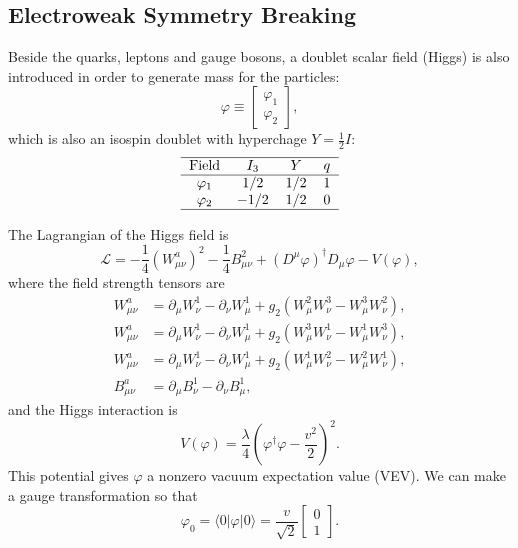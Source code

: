 \subsection{Electroweak Symmetry Breaking}
Beside the quarks, leptons and gauge bosons, a doublet scalar field (Higgs) is also introduced in order to generate mass for the particles:
\begin{equation}
	\varphi \equiv \left[\begin{array}{c}
		\varphi_1 \\ \varphi_2
	\end{array} \right],
\end{equation}
which is also an isospin doublet with hyperchage $Y=\frac{1}{2}I$:
\begin{equation}
	\begin{tabular}{c c c c}
		\hline 
		Field & $I_3$ & $Y$ & $q$\\ \hline
		$\varphi_1$ & $1/2$ & $1/2$ & $1$ \\ 
		$\varphi_2$ & $-1/2$ & $1/2$ & $0$ \\  
		\hline 
	\end{tabular}
\end{equation}

The Lagrangian of the Higgs field is 
\begin{equation}\label{eq:SM-Higgs-L1}
	\mathcal L = -\frac{1}{4}(W^a_{\mu\nu})^2 - \frac{1}{4}B_{\mu\nu}^2 +(D^\mu \varphi)^\dagger D_\mu \varphi- V(\varphi),
\end{equation}
where the field strength tensors are
\begin{equation}
\begin{aligned}
	W^a_{\mu\nu} &= \partial_\mu W_\nu^1 - \partial_\nu W^1_\mu + g_2 (W_\mu^2 W_\nu^3 - W_\mu^3 W_\nu^2), \\
	W^a_{\mu\nu} &= \partial_\mu W_\nu^1 - \partial_\nu W^1_\mu + g_2 (W_\mu^3 W_\nu^1 - W_\mu^1 W_\nu^3), \\
	W^a_{\mu\nu} &= \partial_\mu W_\nu^1 - \partial_\nu W^1_\mu + g_2 (W_\mu^1 W_\nu^2 - W_\mu^2 W_\nu^1), \\
	B^a_{\mu\nu} &= \partial_\mu B_\nu^1 - \partial_\nu B^1_\mu,
\end{aligned}
\end{equation}
and the Higgs interaction is
\begin{equation}
	V(\varphi) = \frac{\lambda}{4} \left(\varphi^\dagger \varphi - \frac{v^2}{2} \right)^2.
\end{equation}
This potential gives $\varphi$ a nonzero vacuum expectation value (VEV). 
We can make a gauge transformation so that
\begin{equation}
	\varphi_0 = \langle 0| \varphi |0\rangle = \frac{v}{\sqrt 2} \left[\begin{array}{c}
		0 \\ 1	\end{array} \right].
\end{equation}


